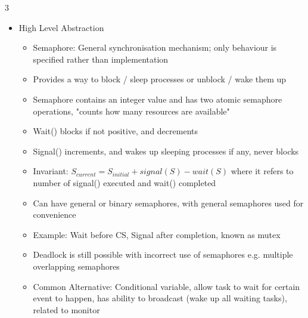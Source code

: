 \documentclass[10pt, landscape]{article}
\begin{document}
\begin{multicols*}{3}
\begin{itemize}
    \item High Level Abstraction
    \begin{itemize}
        \item Semaphore: General synchronisation mechanism; only behaviour is specified rather than implementation
        \item Provides a way to block / sleep processes or unblock / wake them up
        \item Semaphore contains an integer value and has two atomic semaphore operations, "counts how many resources are available"
        \item Wait() blocks if not positive, and decrements
        \item Signal() increments, and wakes up sleeping processes if any, never blocks
        \item Invariant: $S_{current}=S_{initial}+signal(S)-wait(S)$ where it refers to number of signal() executed and wait() completed
        \item Can have general or binary semaphores, with general semaphores used for convenience
        \item Example: Wait before CS, Signal after completion, known as mutex
        \item Deadlock is still possible with incorrect use of semaphores e.g. multiple overlapping semaphores
        \item Common Alternative: Conditional variable, allow task to wait for certain event to happen, has ability to broadcast (wake up all waiting tasks), related to monitor
    \end{itemize}
\end{itemize}


\end{multicols*}
\end{document}
